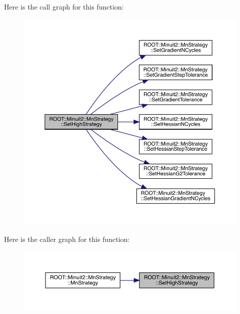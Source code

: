 Here is the call graph for this function\+:
\nopagebreak
\begin{figure}[H]
\begin{center}
\leavevmode
\includegraphics[width=350pt]{da/de4/classROOT_1_1Minuit2_1_1MnStrategy_a92e5deb2087eec6e0d7db5d5789f3a06_cgraph}
\end{center}
\end{figure}
Here is the caller graph for this function\+:
\nopagebreak
\begin{figure}[H]
\begin{center}
\leavevmode
\includegraphics[width=350pt]{da/de4/classROOT_1_1Minuit2_1_1MnStrategy_a92e5deb2087eec6e0d7db5d5789f3a06_icgraph}
\end{center}
\end{figure}
\mbox{\label{classROOT_1_1Minuit2_1_1MnStrategy_a92e5deb2087eec6e0d7db5d5789f3a06}} 
